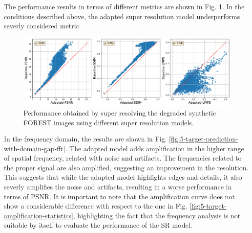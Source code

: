         The performance results in terms of different metrics are shown in Fig. \ref{fig:5-target-prediction-with-domain-gap-dataset}. 
        In the conditions described above, the adapted super resolution model underperforms severly considered metric.


        \begin{figure}[H]
            \centering
            \includegraphics[scale=0.38]{Includes/5-target-prediction-with-domain-gap-dataset.pdf}
            \caption{Performance obtained by super resolving the degraded synthetic FOREST images using different super resolution models.}
            \label{fig:5-target-prediction-with-domain-gap-dataset}
        \end{figure}


        In the frequency domain, the results  are shown in Fig. \ref{fig:5-target-prediction-with-domain-gap-fft}.  
        The adapted model adds amplification in the higher range of spatial frequency, related with noise and artifacts. The frequencies related to the proper signal are also amplified, suggesting an improvement in the resolution.
        This suggests that while the adapted model highlights edges and details, it also severly amplifies the noise and artifacts, resulting in a worse performance in terms of PSNR.
        It is important to note that the amplification curve does not show a considerable difference with respect to the one in Fig. \ref{fig:5-target-amplification-statistics},
        highlighting the fact that the frequency analysis is not suitable by itself to evaluate the performance of the SR model.

